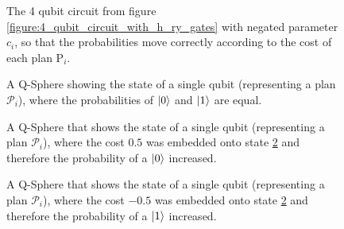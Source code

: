 \begin{figure}[!h]
    \centering
    \caption{The 4 qubit circuit from figure \ref{figure:4_qubit_circuit_with_h_ry_gates} with negated parameter $c_i$, so that the probabilities move correctly according to the cost of each plan $\mathrm{P}_i$.}
    \label{figure:4_qubit_circuit_with_h_neg_ry_gates}
\end{figure}


\begin{figure}[!h]
    \centering
    \scalebox{\histogramwidth}{
        
    }
    \caption{A Q-Sphere showing the state of a single qubit (representing a plan $\mathcal{P}_i$), where the probabilities of $\ket{0}$ and $\ket{1}$ are equal.}
    \label{figure:q_sphere_no_cost}
\end{figure}

\begin{figure}[!h]
    \centering
    \scalebox{\histogramwidth}{
        
    }
    \caption{A Q-Sphere that shows the state of a single qubit (representing a plan $\mathcal{P}_i$), where the cost $0.5$ was embedded onto state \ref{figure:q_sphere_no_cost} and therefore the probability of a $\ket{0}$ increased.}
    \label{figure:q_sphere_bad_cost}
\end{figure}

\begin{figure}[!h]
    \centering
    \scalebox{\histogramwidth}{
        
    }
    \caption{A Q-Sphere that shows the state of a single qubit (representing a plan $\mathcal{P}_i$), where the cost $-0.5$ was embedded onto state \ref{figure:q_sphere_no_cost} and therefore the probability of a $\ket{1}$ increased.}
    \label{figure:q_sphere_good_cost}
\end{figure}

